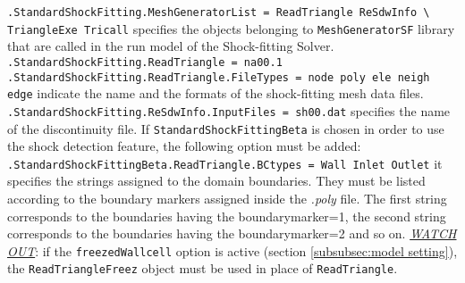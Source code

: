 \documentclass[11pt,a4paper,oneside]{article}
\begin{document}
\hspace*{1cm}\texttt{.StandardShockFitting.MeshGeneratorList = ReadTriangle ReSdwInfo \textbackslash{}}
\newline
\hspace*{9.5cm} \texttt{TriangleExe Tricall}
\newline
\newline
specifies the objects belonging to \texttt{MeshGeneratorSF} library that are called in the run model of the Shock-fitting Solver.
\newline
\newline
\hspace*{1cm} \texttt{.StandardShockFitting.ReadTriangle = na00.1}
\newline
\hspace*{1cm} \texttt{.StandardShockFitting.ReadTriangle.FileTypes = node poly ele neigh edge}
\newline
\newline
indicate the name and the formats of the shock-fitting mesh data files.
\newline
\newline
\hspace*{1cm} \texttt{.StandardShockFitting.ReSdwInfo.InputFiles = sh00.dat}
\newline
\newline
specifies the name of the discontinuity file.
\newline
\newline
If \texttt{StandardShockFittingBeta} is chosen in order to use the shock detection feature, the following option must be added:
\newline
\newline
\hspace*{1cm} \texttt{.StandardShockFittingBeta.ReadTriangle.BCtypes = Wall Inlet Outlet}
\newline
\newline
it specifies the strings assigned to the domain boundaries. They must be listed according to the boundary markers assigned inside the \textit{.poly} file. The first string corresponds to the boundaries having the boundarymarker=1, the second string corresponds to the boundaries having the boundarymarker=2 and so on.
\newline
\newline
\underline{\emph{WATCH OUT}}: if the \texttt{freezedWallcell} option is active (section \ref{subsubsec:model setting}), the \texttt{ReadTriangleFreez} object must be used in place of \texttt{ReadTriangle}.
\end{document}
